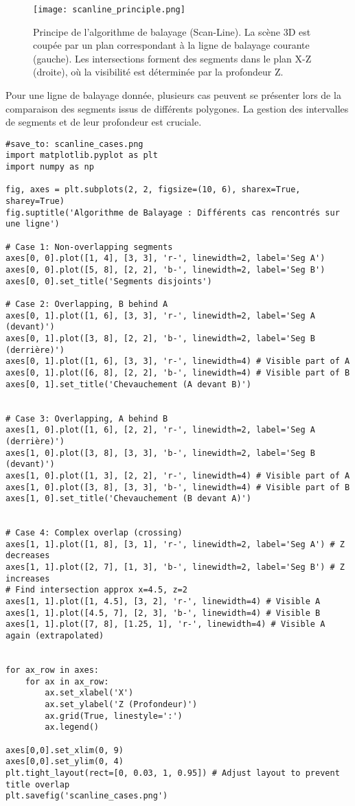 \documentclass{article}
\begin{document}
\begin{figure}[H]
\centering
\texttt{[image: scanline\_principle.png]}
\caption{Principe de l'algorithme de balayage (Scan-Line). La scène 3D est coupée par un plan correspondant à la ligne de balayage courante (gauche). Les intersections forment des segments dans le plan X-Z (droite), où la visibilité est déterminée par la profondeur Z.}
\label{fig:scanline_principle}
\end{figure}

Pour une ligne de balayage donnée, plusieurs cas peuvent se présenter lors de la comparaison des segments issus de différents polygones. La gestion des intervalles de segments et de leur profondeur est cruciale.

\begin{verbatim}
#save_to: scanline_cases.png
import matplotlib.pyplot as plt
import numpy as np

fig, axes = plt.subplots(2, 2, figsize=(10, 6), sharex=True, sharey=True)
fig.suptitle('Algorithme de Balayage : Différents cas rencontrés sur une ligne')

# Case 1: Non-overlapping segments
axes[0, 0].plot([1, 4], [3, 3], 'r-', linewidth=2, label='Seg A')
axes[0, 0].plot([5, 8], [2, 2], 'b-', linewidth=2, label='Seg B')
axes[0, 0].set_title('Segments disjoints')

# Case 2: Overlapping, B behind A
axes[0, 1].plot([1, 6], [3, 3], 'r-', linewidth=2, label='Seg A (devant)')
axes[0, 1].plot([3, 8], [2, 2], 'b-', linewidth=2, label='Seg B (derrière)')
axes[0, 1].plot([1, 6], [3, 3], 'r-', linewidth=4) # Visible part of A
axes[0, 1].plot([6, 8], [2, 2], 'b-', linewidth=4) # Visible part of B
axes[0, 1].set_title('Chevauchement (A devant B)')


# Case 3: Overlapping, A behind B
axes[1, 0].plot([1, 6], [2, 2], 'r-', linewidth=2, label='Seg A (derrière)')
axes[1, 0].plot([3, 8], [3, 3], 'b-', linewidth=2, label='Seg B (devant)')
axes[1, 0].plot([1, 3], [2, 2], 'r-', linewidth=4) # Visible part of A
axes[1, 0].plot([3, 8], [3, 3], 'b-', linewidth=4) # Visible part of B
axes[1, 0].set_title('Chevauchement (B devant A)')


# Case 4: Complex overlap (crossing)
axes[1, 1].plot([1, 8], [3, 1], 'r-', linewidth=2, label='Seg A') # Z decreases
axes[1, 1].plot([2, 7], [1, 3], 'b-', linewidth=2, label='Seg B') # Z increases
# Find intersection approx x=4.5, z=2
axes[1, 1].plot([1, 4.5], [3, 2], 'r-', linewidth=4) # Visible A
axes[1, 1].plot([4.5, 7], [2, 3], 'b-', linewidth=4) # Visible B
axes[1, 1].plot([7, 8], [1.25, 1], 'r-', linewidth=4) # Visible A again (extrapolated)


for ax_row in axes:
    for ax in ax_row:
        ax.set_xlabel('X')
        ax.set_ylabel('Z (Profondeur)')
        ax.grid(True, linestyle=':')
        ax.legend()

axes[0,0].set_xlim(0, 9)
axes[0,0].set_ylim(0, 4)
plt.tight_layout(rect=[0, 0.03, 1, 0.95]) # Adjust layout to prevent title overlap
plt.savefig('scanline_cases.png')
\end{verbatim}
\end{document}
